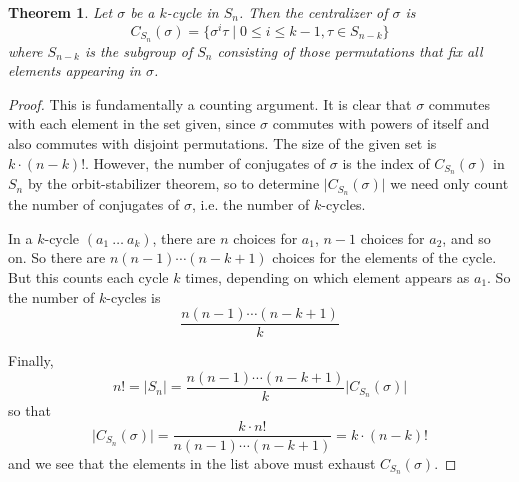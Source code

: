 \documentclass[12pt]{article}
\newtheorem{thm}{Theorem}
\begin{document}
\begin{thm} Let $\sigma$ be a $k$-cycle in $S_n$. Then the centralizer of $\sigma$ is
\[C_{S_n}(\sigma)=\{\sigma^i \tau \mid 0\leq i\leq k-1, \tau\in S_{n-k}\}\]
where $S_{n-k}$ is the subgroup of $S_n$ consisting of those permutations that fix all elements appearing in $\sigma$.
\end{thm}
\begin{proof}
This is fundamentally a counting argument. It is clear that $\sigma$ commutes with each element in the set given, since $\sigma$ commutes with powers of itself and also commutes with disjoint permutations. The size of the given set is $k\cdot (n-k)!$. However, the number of conjugates of $\sigma$ is the index of $C_{S_n}(\sigma)$ in $S_n$ by the orbit-stabilizer theorem, so to determine $\lvert C_{S_n}(\sigma)\rvert$ we need only count the number of conjugates of $\sigma$, i.e. the number of $k$-cycles.

In a $k$-cycle $(a_1~\ldots~a_k)$, there are $n$ choices for $a_1$, $n-1$ choices for $a_2$, and so on. So there are $n(n-1)\cdots(n-k+1)$ choices for the elements of the cycle. But this counts each cycle $k$ times, depending on which element appears as $a_1$. So the number of $k$-cycles is
\[\frac{n(n-1)\cdots(n-k+1)}{k}\]

Finally,
\[n!=\lvert S_n\rvert = \frac{n(n-1)\cdots(n-k+1)}{k}\lvert C_{S_n}(\sigma)\rvert\]
so that
\[\lvert C_{S_n}(\sigma)\rvert=\frac{k\cdot n!}{n(n-1)\cdots(n-k+1)}=k\cdot (n-k)!\]
and we see that the elements in the list above must exhaust $C_{S_n}(\sigma)$.
\end{proof}
\end{document}
